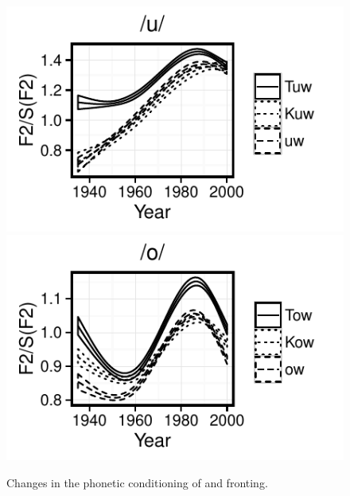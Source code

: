 \documentclass[12pt]{article}
\begin{document}
\vspace*{6pt}
\begin{figure}[H]
\centering
\includegraphics[scale=0.9]{uwphoneticconditioning}
\includegraphics[scale=0.9]{owphoneticconditioning}
\caption{Changes in the phonetic conditioning of  and  fronting.}
\end{figure}
\vspace*{6pt}
\end{document}
